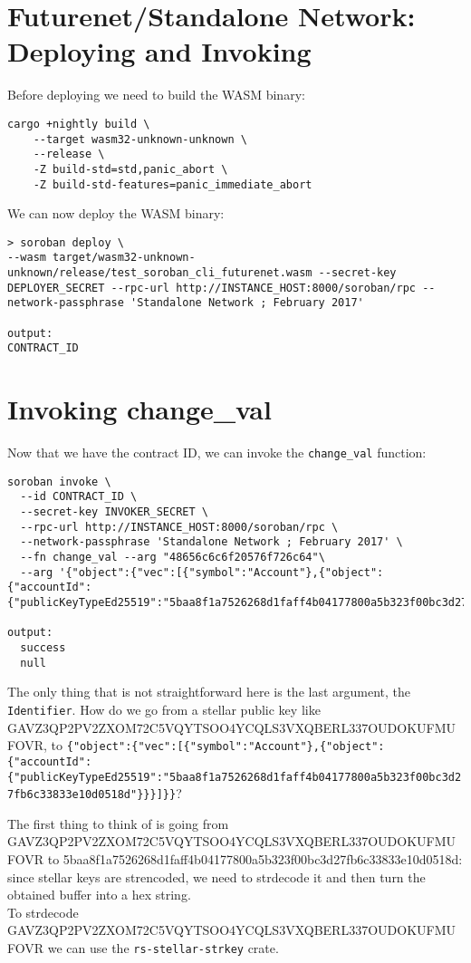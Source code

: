 \documentclass[10pt]{article}
\begin{document}
\section*{Futurenet/Standalone Network: Deploying and Invoking}
Before deploying we need to build the WASM binary:

\begin{verbatim}
cargo +nightly build \
    --target wasm32-unknown-unknown \
    --release \
    -Z build-std=std,panic_abort \
    -Z build-std-features=panic_immediate_abort
\end{verbatim}

We can now deploy the WASM binary:

\begin{verbatim}
> soroban deploy \
--wasm target/wasm32-unknown-unknown/release/test_soroban_cli_futurenet.wasm --secret-key DEPLOYER_SECRET --rpc-url http://INSTANCE_HOST:8000/soroban/rpc --network-passphrase 'Standalone Network ; February 2017'

output:
CONTRACT_ID
\end{verbatim}

\section*{Invoking change\_val}
Now that we have the contract ID, we can invoke the \texttt{change\_val} function:

\begin{verbatim}
soroban invoke \
  --id CONTRACT_ID \
  --secret-key INVOKER_SECRET \
  --rpc-url http://INSTANCE_HOST:8000/soroban/rpc \
  --network-passphrase 'Standalone Network ; February 2017' \
  --fn change_val --arg "48656c6c6f20576f726c64"\
  --arg '{"object":{"vec":[{"symbol":"Account"},{"object":{"accountId":{"publicKeyTypeEd25519":"5baa8f1a7526268d1faff4b04177800a5b323f00bc3d27fb6c33833e10d0518d"}}}]}}'

output:
  success
  null
\end{verbatim}

The only thing that is not straightforward here is the last argument, the \texttt{Identifier}. How do we go from a stellar public key like GAVZ3QP2PV2ZXOM72C5VQYTSOO4YCQLS3VXQBERL337OUDOKUFMUFOVR, to \texttt{\{"object":\{"vec":[\{"symbol":"Account"\},\{"object":\{"accountId":\{"publicKeyTypeEd25519":"5baa8f1a7526268d1faff4b04177800a5b323f00bc3d27fb6c33833e10d0518d"\}\}\}]\}\}}?

The first thing to think of is going from GAVZ3QP2PV2ZXOM72C5VQYTSOO4YCQLS3VXQBERL337OUDOKUFMUFOVR to 5baa8f1a7526268d1faff4b04177800a5b323f00bc3d27fb6c33833e10d0518d: since stellar keys are strencoded, we need to strdecode it and then turn the obtained buffer into a hex string.\\
To strdecode GAVZ3QP2PV2ZXOM72C5VQYTSOO4YCQLS3VXQBERL337OUDOKUFMUFOVR we can use the \texttt{rs-stellar-strkey} crate.
\end{document}
